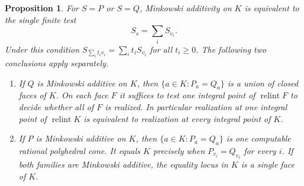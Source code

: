 \documentclass[11pt,reqno]{amsart}
\numberwithin{equation}{section}
\newtheorem{proposition}[theorem]{Proposition}
\theoremstyle{definition}
\theoremstyle{remark}
\begin{document}
\begin{proposition}\label{prop:single-sum-realization-cone}
For \(S=P\) or \(S=Q\), Minkowski additivity on \(K\) is equivalent to the
single finite test
\[ S_s=\sum_i S_{v_i}. \]
Under this condition \(S_{\sum_i t_i v_i}=\sum_i t_iS_{v_i}\) for
all \(t_i\ge0\). The following two conclusions apply separately.
\begin{enumerate}
\item If \(Q\) is Minkowski additive on \(K\), then
\(\{a\in K:P_a=Q_a\}\) is a union of closed faces of \(K\). On each
face \(F\) it suffices to test one integral point of
\(\operatorname{relint}F\) to decide whether all of \(F\) is realized.
In particular realization at one integral point of
\(\operatorname{relint}K\) is equivalent to realization at every
integral point of \(K\).
\item If \(P\) is Minkowski additive on \(K\), then
\(\{a\in K:P_a=Q_a\}\) is one computable rational polyhedral cone.
It equals \(K\) precisely when \(P_{v_i}=Q_{v_i}\) for every \(i\).
If both families are Minkowski additive, the equality locus in \(K\)
is a single face of \(K\).
\end{enumerate}
\end{proposition}
\end{document}
